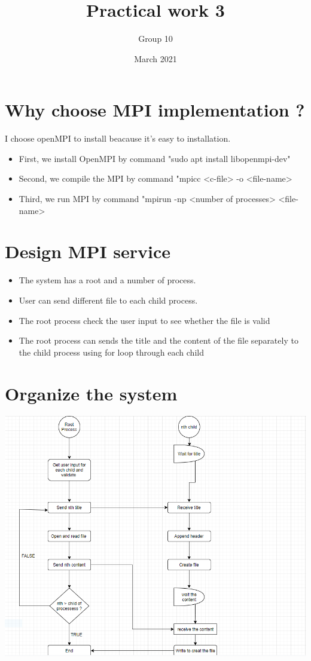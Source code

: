 \documentclass{article}
\title{Practical work 3}
\author{Group 10}
\date{March 2021}
\begin{document}
\maketitle
\section{Why choose MPI implementation ?}
I choose openMPI to install beacause it's easy to installation.
\begin{itemize}
    \item First, we install OpenMPI by command "sudo apt install libopenmpi-dev"
    \item Second, we compile the MPI by command "mpicc <c-file> -o <file-name>
    \item Third, we run MPI by command "mpirun -np <number of processes> <file-name>
\end{itemize}

\section{Design MPI service}
\begin{itemize}
\item The system has a root and a number of process. 
\item User can send different file to each child process.
\item The root process check the user input to see whether the file is valid
\item The root process can sends the title and the content of the file separately to the child process using for loop through each child
\end{itemize}
\section{Organize the system}
\centering
\includegraphics[scale=0.35]{MPI.PNG}
\end{document}

